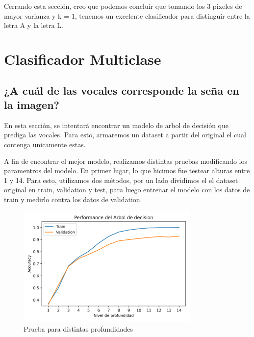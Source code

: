 \documentclass[10pt,a4paper]{article}
\begin{document}
\vspace{0.05cm}

Cerrando esta sección, creo que podemos concluir que tomando los 3 pixeles de mayor varianza y k = 1, tenemos un excelente clasificador para distinguir entre la letra A y la letra L.


\section{Clasificador Multiclase}

\vspace{0.05cm}

\subsection{¿A cuál de las vocales corresponde la seña en la imagen?}

En esta sección, se intentará encontrar un modelo de arbol de decisión que prediga las vocales. Para esto, armaremos un dataset a partir del original el cual contenga unicamente estas. \vspace{0.05cm}

A fin de encontrar el mejor modelo, realizamos distintas pruebas modificando los paramentros del modelo. En primer lugar, lo que hicimos fue testear alturas
entre 1 y 14. Para esto, utilizamos dos métodos, por un lado dividimos el el dataset original en train, validation y test, para luego entrenar
el modelo con los datos de train y medirlo contra los datos de validation. 

\begin{figure}[h]
  \centering
  \includegraphics[width=0.8\textwidth]{Imagenes/primer_prueba_arbol.png}
  \caption{Prueba para distintas profundidades}
  \label{fig:Tabla 1}
\end{figure}
\end{document}
